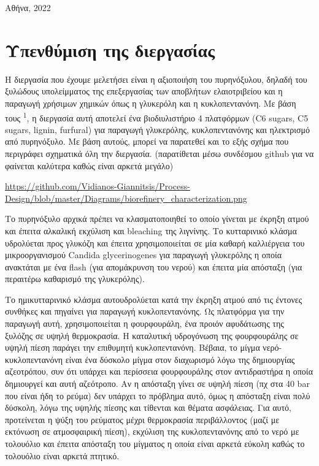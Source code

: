 \documentclass[11pt]{article}
\begin{document}
\begin{titlepage}
\begin{center}
  \vfill
  {\large Αθήνα, 2022}
\end{center}

\end{titlepage}

\tableofcontents
\pagebreak

\section{Υπενθύμιση της διεργασίας}
\label{sec:orgcfc8cb4}
Η διεργασία που έχουμε μελετήσει είναι η αξιοποιήση του πυρηνόξυλου, δηλαδή του ξυλώδους υπολείμματος της επεξεργασίας των αποβλήτων ελαιοτριβείου και η παραγωγή χρήσιμων χημικών όπως η γλυκερόλη και η κυκλοπεντανόνη. Με βάση τους \textsuperscript{1}, η διεργασία αυτή αποτελεί ένα βιοδιυλιστήριο 4 πλατφόρμων (C6 sugars, C5 sugars, lignin, furfural) για παραγωγή γλυκερόλης, κυκλοπεντανόνης και ηλεκτρισμό από πυρηνόξυλο. Με βάση αυτούς, μπορεί να παρατεθεί και το εξής σχήμα που περιγράφει σχηματικά όλη την διεργασία. (παρατίθεται μέσω συνδέσμου github για να φαίνεται καλύτερα καθώς είναι αρκετά μεγάλο)

\url{https://github.com/Vidianos-Giannitsis/Process-Design/blob/master/Diagrams/biorefinery\_characterization.png}

Το πυρηνόξυλο αρχικά πρέπει να κλασματοποιηθεί το οποίο γίνεται με έκρηξη ατμού και έπειτα αλκαλική εκχύλιση και bleaching της λιγνίνης. Το κυτταρινικό κλάσμα υδρολύεται προς γλυκόζη και έπειτα χρησιμοποιείται σε μία καθαρή καλλιέργεια του μικροοργανισμού Candida glycerinogenes για παραγωγή γλυκερόλης η οποία ανακτάται με ένα flash (για απομάκρυνση του νερού) και έπειτα μία απόσταξη (για περαιτέρω καθαρισμό της γλυκερόλης).

Το ημικυτταρινικό κλάσμα αυτουδρολύεται κατά την έκρηξη ατμού από τις έντονες συνθήκες και πηγαίνει για παραγωγή κυκλοπεντανόνης. Ως πλατφόρμα για την παραγωγή αυτή, χρησιμοποιείται η φουρφουράλη, ένα προιόν αφυδάτωσης της ξυλόζης σε υψηλή θερμοκρασία. Η καταλυτική υδρογόνωση της φουρφουράλης σε υψηλή πίεση παράγει την επιθυμητή κυκλοπεντανόνη. Βέβαια, το μίγμα νερό-κυκλοπεντανόνη είναι ένα δύσκολο μίγμα στον διαχωρισμό λόγω της δημιουργίας αζεοτρόπου, συν ότι υπάρχει και περίσσεια φουρφουράλης στον αντιδραστήρα η οποία δημιουργεί και αυτή αζεότροπο. Αν η απόσταξη γίνει σε υψηλή πίεση (πχ στα 40 bar που είναι ήδη το ρεύμα) δεν υπάρχει το πρόβλημα αυτό, όμως η απόσταξη είναι πολύ δύσκολη, λόγω της υψηλής πίεσης και τίθενται και θέματα ασφάλειας. Για αυτό, προτείνεται η ψύξη του ρεύματος μέχρι θερμοκρασία περιβάλλοντος (μαζί με εκτόνωση σε ατμοσφαιρική πίεση), εκχύλιση της κυκλοπεντανόνης από το νερό με τολουόλιο και έπειτα απόσταξη του μίγματος η οποία είναι αρκετά εύκολη καθώς το τολουόλιο είναι αρκετά πτητικό.
\end{document}
